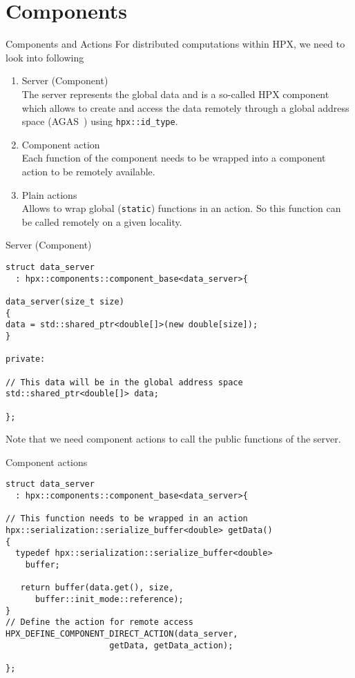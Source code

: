 \documentclass[12pt,t]{beamer}
\begin{document}
\section{Components}

\begin{frame}{Components and Actions}
For distributed computations within HPX, we need to look into following 

\begin{enumerate}
\item Server (Component) \\
The server represents the global data and is a so-called HPX component which allows to create and access the data remotely through a global address space (AGAS~\cite{kaiser2014hpx}) using \lstinline|hpx::id_type|.
\item Component action \\
Each function of the component needs to be wrapped into a component action to be remotely available. 
\item Plain actions \\
Allows to wrap global (\lstinline|static|) functions in an action. So this function can be called remotely on a given locality.
\end{enumerate} 

\end{frame}


\begin{frame}[fragile]{Server (Component)}
\begin{lstlisting}
struct data_server
  : hpx::components::component_base<data_server>{

data_server(size_t size)
{
data = std::shared_ptr<double[]>(new double[size]);
}

private:

// This data will be in the global address space 
std::shared_ptr<double[]> data;

};
\end{lstlisting}
Note that we need component actions to call the public functions of the server.
\end{frame}


\begin{frame}[fragile]{Component actions}
\begin{lstlisting}
struct data_server
  : hpx::components::component_base<data_server>{

// This function needs to be wrapped in an action
hpx::serialization::serialize_buffer<double> getData()
{
  typedef hpx::serialization::serialize_buffer<double> 
    buffer;
  
   return buffer(data.get(), size,
      buffer::init_mode::reference);
}
// Define the action for remote access
HPX_DEFINE_COMPONENT_DIRECT_ACTION(data_server,
                     getData, getData_action);

};
\end{lstlisting}
\end{frame}
\end{document}
